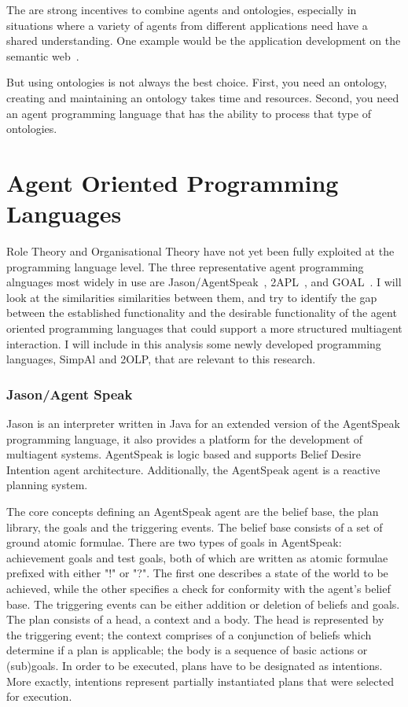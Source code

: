 \documentclass[a4paper,12pt,oneside,fleqn]{book} %
\begin{document}
The are strong incentives to combine agents and ontologies, especially in
situations where a variety of agents from different applications need have
a shared understanding. One example would be the application development on
the semantic web~\cite{DBLP:conf/dalt/MoreiraVBH05}.


But using ontologies is not always the best choice. First, you need an ontology,
creating and maintaining an ontology takes time and resources. Second, you
need an agent programming language that has the ability to process
that type of ontologies. 


\chapter{Agent Oriented Programming Languages} %
Role Theory and Organisational Theory have not yet been fully exploited at
the programming language level. The three representative agent programming
alnguages most widely in use are
Jason/AgentSpeak~\cite{DBLP:books/sp/map2005/BordiniHV05},
2APL~\cite{DBLP:journals/aamas/Dastani08}, and
GOAL~\cite{DBLP:journals/corr/cs-AI-0207008}. I will look at
the similarities similarities between them, and try to identify the gap
between the established functionality and the desirable functionality of
the agent oriented programming languages that could support a more
structured multiagent interaction. I will include in this analysis some
newly developed programming languages, SimpAl and 2OLP, that are relevant
to this research.

\subsection{Jason/Agent Speak} %
Jason is an interpreter written in Java for an extended version of the
AgentSpeak programming language, it also provides a platform for the
development of multiagent systems. AgentSpeak is logic based and supports
Belief Desire Intention agent architecture. Additionally, the AgentSpeak
agent is a reactive planning system.

The core concepts defining an AgentSpeak agent are the belief base, the
plan library, the goals and the triggering events. The belief base consists
of a set of ground atomic formulae. There are two types of goals in
AgentSpeak: achievement goals and test goals, both of which are written as
atomic formulae prefixed with either "!" or "?". The first one describes a
state of the world to be achieved, while the other specifies a check for
conformity with the agent's belief base. The triggering events can be
either addition or deletion of beliefs and goals. The plan consists of a
head, a context and a body. The head is represented by the triggering
event; the context comprises of a conjunction of beliefs which determine if a
plan is applicable; the body is a sequence of basic actions or
(sub)goals. In order to be executed, plans have to be designated as
intentions. More exactly, intentions represent partially instantiated
plans that were selected for execution.
\end{document}
